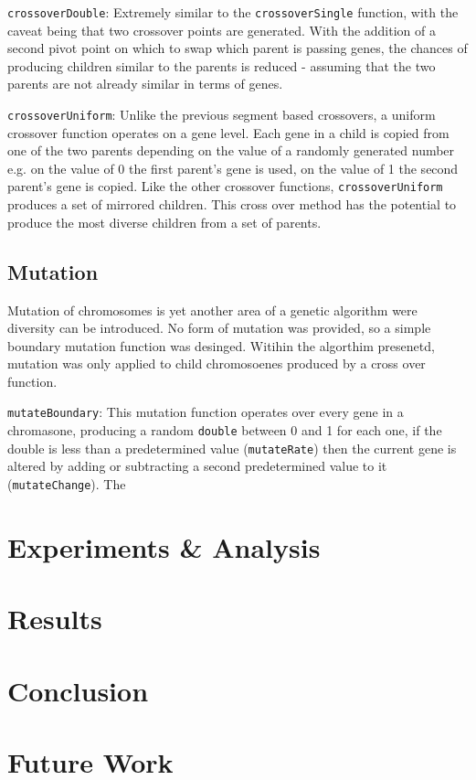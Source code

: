			\texttt{crossoverDouble}: Extremely similar to the  \texttt{crossoverSingle} function, with the caveat being that two crossover points are generated. With the addition of a second pivot point on which to swap which parent is passing genes, the chances of producing children similar to the parents is reduced - assuming that the two parents are not already similar in terms of genes.
			
			\texttt{crossoverUniform}: Unlike the previous segment based crossovers, a uniform crossover function operates on a gene level. Each gene in a child is copied from one of the two parents depending on the value of a randomly generated number e.g. on the value of 0 the first parent's gene is used, on the value of 1 the second parent's gene is copied. Like the other crossover functions, \texttt{crossoverUniform} produces a set of mirrored children. This cross over method has the potential to produce the most diverse children from a set of parents. 
			
		\subsection{Mutation}
			Mutation of chromosomes is yet another area of a genetic algorithm were diversity can be introduced. No form of mutation was provided, so a simple boundary mutation function was desinged. Witihin the algorthim presenetd, mutation was only applied to child chromosoenes produced by a cross over function.
			
			\texttt{mutateBoundary}: This mutation function operates over every gene in a chromasone, producing a random \texttt{double} between 0 and 1 for each one, if the double is less than a predetermined value (\texttt{mutateRate}) then the current gene is altered by adding  or subtracting a second predetermined value to it (\texttt{mutateChange}). The \texttt{}
			
			
\section{Experiments \& Analysis}


\section{Results}
	

\section{Conclusion}


\section{Future Work}
